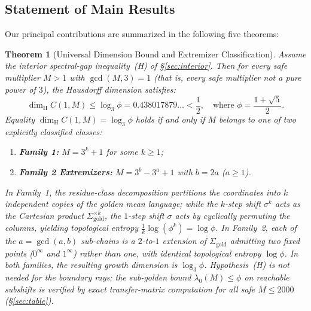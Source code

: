 \documentclass[11pt,reqno]{amsart}
\theoremstyle{plain}
\newtheorem{theorem}{Theorem}[section]
\theoremstyle{definition}
\theoremstyle{remark}
\newcommand{\dimH}{\dim_{\mathrm{H}}}
\begin{document}
\subsection{Statement of Main Results}

Our principal contributions are summarized in the following five theorems:

\begin{theorem}[Universal Dimension Bound and Extremizer Classification]\label{thm:universal_bound}
Assume the interior spectral-gap inequality~(H) of \S\ref{sec:interior}. Then for every safe multiplier $M > 1$ with $\gcd(M, 3) = 1$ (that is, every safe multiplier not a pure power of $3$), the Hausdorff dimension satisfies:
\begin{equation}
\dimH C(1, M) \le \log_3 \phi = 0.438017879\dots < \frac{1}{2}, \quad \text{where } \phi = \frac{1 + \sqrt{5}}{2}.
\end{equation}
Equality $\dimH C(1, M) = \log_3 \phi$ holds if and only if $M$ belongs to one of two explicitly classified classes:
\begin{enumerate}
    \item \textbf{Family 1:} $M = 3^k + 1$ for some $k \ge 1$;
    \item \textbf{Family 2 Extremizers:} $M = 3^{b} - 3^{a} + 1$ with $b = 2a$ ($a \ge 1$).
\end{enumerate}
In Family~1, the residue-class decomposition partitions the coordinates into $k$ independent copies of the golden mean language; while the $k$-step shift $\sigma^k$ acts as the Cartesian product $\Sigma_{\mathrm{gold}}^{\times k}$, the $1$-step shift $\sigma$ acts by cyclically permuting the columns, yielding topological entropy $\frac{1}{k}\log(\phi^k) = \log \phi$. In Family~2, each of the $a = \gcd(a, b)$ sub-chains is a $2$-to-$1$ extension of $\Sigma_{\mathrm{gold}}$ admitting two fixed points ($0^\infty$ and $1^\infty$) rather than one, with identical topological entropy $\log \phi$. In both families, the resulting growth dimension is $\log_3 \phi$. Hypothesis~(H) is not needed for the boundary rays; the sub-golden bound $\lambda_0(M) \le \phi$ on reachable subshifts is verified by exact transfer-matrix computation for all safe $M \le 2000$ (\S\ref{sec:table}).
\end{theorem}
\end{document}
